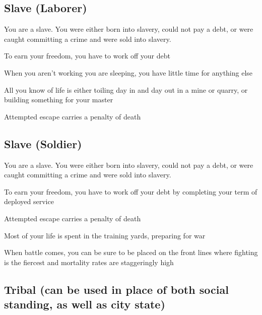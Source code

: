 \begin{multicols}{2}
\subsection{Slave (Laborer)}

\begin{description}
    \item You are a slave. You were either born into slavery, could not pay a debt, or were caught committing a crime and were sold into slavery.
    \item To earn your freedom, you have to work off your debt
    \item When you aren’t working you are sleeping, you have little time for anything else
    \item All you know of life is either toiling day in and day out in a mine or quarry, or building something for your master
    \item Attempted escape carries a penalty of death
\end{description}

\subsection{Slave (Soldier)}

\begin{description}
    \item You are a slave. You were either born into slavery, could not pay a debt, or were caught committing a crime and were sold into slavery.
    \item To earn your freedom, you have to work off your debt by completing your term of deployed service
    \item Attempted escape carries a penalty of death
    \item Most of your life is spent in the training yards, preparing for war
    \item When battle comes, you can be sure to be placed on the front lines where fighting is the fiercest and mortality rates are staggeringly high
\end{description}

\subsection{Tribal (can be used in place of both social standing, as well as city state)}


\end{multicols}
